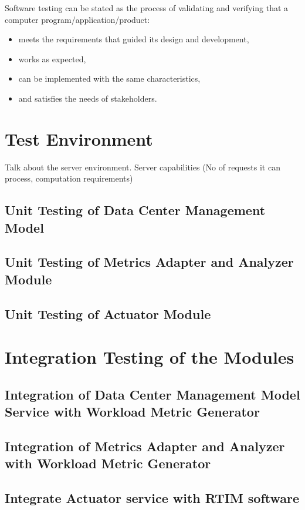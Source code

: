 \documentclass[12pt]{report}
\begin{document}
Software testing can be stated as the process of validating and verifying that a computer program/application/product:


\begin{itemize}
\item meets the requirements that guided its design and development,
\item works as expected,
\item can be implemented with the same characteristics,
\item and satisfies the needs of stakeholders.

\end{itemize}
\section{Test Environment}
Talk about the server environment. 
Server capabilities (No of requests it can process, computation requirements)
\subsection{Unit Testing of Data Center Management Model}

\subsection{Unit Testing of Metrics Adapter and Analyzer Module}
\subsection{Unit Testing of Actuator Module}

\section{Integration Testing of the Modules}
\subsection{Integration of Data Center Management Model Service with Workload Metric Generator}
\subsection{Integration of Metrics Adapter and Analyzer with Workload Metric Generator}
\subsection{Integrate Actuator service with RTIM software}
\end{document}
